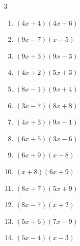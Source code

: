 \begin{multicols}{3}
\begin{enumerate}

  \item $(4x+4)(4x-6)$


  \item $(9x-7)(x-5)$


  \item $(9x+3)(9x-3)$


  \item $(4x+2)(5x+3)$


  \item $(8x-1)(9x+4)$


  \item $(3x-7)(8x+8)$


  \item $(4x+3)(9x-1)$


  \item $(6x+5)(3x-6)$


\columnbreak %

  \item $(6x+9)(x-8)$


  \item $(x+8)(6x+9)$


  \item $(8x+7)(5x+9)$


  \item $(8x-7)(x+2)$


  \item $(5x+6)(7x-9)$


  \item $(5x-4)(x-3)$



\end{enumerate}
\end{multicols}
